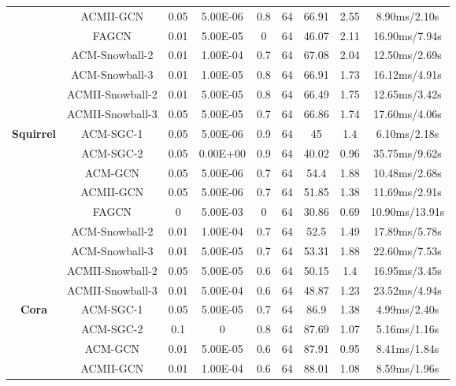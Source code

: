 \documentclass{article}
\newcommand{\0}{{\boldsymbol{0}}}
\newcommand{\6}{{\partial}}
\newcommand{\8}{{\infty}}
\newcommand{\4}{{\nabla}}
\begin{document}
\begin{table}[htbp]
{\begin{tabular}{c|c|ccccccc}
          & ACMII-GCN & 0.05  & 5.00E-06 & 0.8   & 64    & 66.91 & 2.55  & 8.90ms/2.10s \\
          & FAGCN & 0.01  & 5.00E-05 & 0     & 64    & 46.07 & 2.11  & 16.90ms/7.94s \\
          & ACM-Snowball-2 & 0.01  & 1.00E-04 & 0.7   & 64    & 67.08 & 2.04  & 12.50ms/2.69s \\
          & ACM-Snowball-3 & 0.01  & 1.00E-05 & 0.8   & 64    & 66.91 & 1.73  & 16.12ms/4.91s \\
          & ACMII-Snowball-2 & 0.01  & 5.00E-05 & 0.8   & 64    & 66.49 & 1.75  & 12.65ms/3.42s \\
          & ACMII-Snowball-3 & 0.05  & 5.00E-05 & 0.7   & 64    & 66.86 & 1.74  & 17.60ms/4.06s \\
           \midrule
    \multirow{9}[0]{*}{\textbf{Squirrel}} & ACM-SGC-1 & 0.05  & 5.00E-06 & 0.9   & 64    & 45    & 1.4   & 6.10ms/2.18s \\
          & ACM-SGC-2 & 0.05  & 0.00E+00 & 0.9   & 64    & 40.02 & 0.96  & 35.75ms/9.62s \\
          & ACM-GCN & 0.05  & 5.00E-06 & 0.7   & 64    & 54.4  & 1.88  & 10.48ms/2.68s \\
          & ACMII-GCN & 0.05  & 5.00E-06 & 0.7   & 64    & 51.85 & 1.38  & 11.69ms/2.91s \\
          & FAGCN & 0     & 5.00E-03 & 0     & 64    & 30.86 & 0.69  & 10.90ms/13.91s \\
          & ACM-Snowball-2 & 0.01  & 1.00E-04 & 0.7   & 64    & 52.5  & 1.49  & 17.89ms/5.78s \\
          & ACM-Snowball-3 & 0.01  & 5.00E-05 & 0.7   & 64    & 53.31 & 1.88  & 22.60ms/7.53s \\
          & ACMII-Snowball-2 & 0.05  & 5.00E-05 & 0.6   & 64    & 50.15 & 1.4   & 16.95ms/3.45s \\
          & ACMII-Snowball-3 & 0.01  & 5.00E-04 & 0.6   & 64    & 48.87 & 1.23  & 23.52ms/4.94s \\
           \midrule
    \multirow{9}[0]{*}{\textbf{Cora}} & ACM-SGC-1 & 0.05  & 5.00E-05 & 0.7   & 64    & 86.9  & 1.38  & 4.99ms/2.40s \\
          & ACM-SGC-2 & 0.1   & 0     & 0.8   & 64    & 87.69 & 1.07  & 5.16ms/1.16s \\
          & ACM-GCN & 0.01  & 5.00E-05 & 0.6   & 64    & 87.91 & 0.95  & 8.41ms/1.84s \\
          & ACMII-GCN & 0.01  & 1.00E-04 & 0.6   & 64    & 88.01 & 1.08  & 8.59ms/1.96s \\

\end{tabular}}
\end{table}
\end{document}
